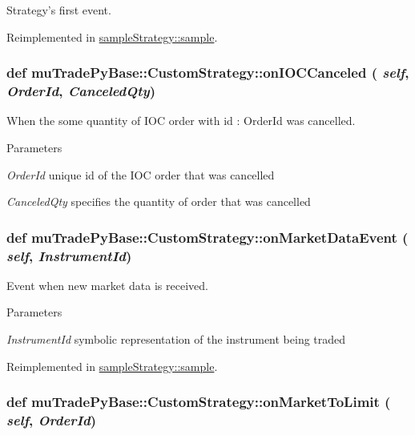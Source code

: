 Strategy's first event. 

Reimplemented in \hyperlink{classsampleStrategy_1_1sample_a412c1e16766e2af518a879c781dfb70c}{sampleStrategy::sample}.\hypertarget{classmuTradePyBase_1_1CustomStrategy_a409e9147a6d8d52dc2d3ad04544e31f3}{
\subsubsection[{onIOCCanceled}]{\setlength{\rightskip}{0pt plus 5cm}def muTradePyBase::CustomStrategy::onIOCCanceled ( {\em self}, \/   {\em OrderId}, \/   {\em CanceledQty})}}
\label{classmuTradePyBase_1_1CustomStrategy_a409e9147a6d8d52dc2d3ad04544e31f3}


When the some quantity of IOC order with id : OrderId was cancelled. 
\begin{DoxyParams}{Parameters}
\item[{\em OrderId}]unique id of the IOC order that was cancelled \item[{\em CanceledQty}]specifies the quantity of order that was cancelled \end{DoxyParams}
\hypertarget{classmuTradePyBase_1_1CustomStrategy_aea61c58829beb5f5e4bfa3355da9a23b}{
\subsubsection[{onMarketDataEvent}]{\setlength{\rightskip}{0pt plus 5cm}def muTradePyBase::CustomStrategy::onMarketDataEvent ( {\em self}, \/   {\em InstrumentId})}}
\label{classmuTradePyBase_1_1CustomStrategy_aea61c58829beb5f5e4bfa3355da9a23b}


Event when new market data is received. 
\begin{DoxyParams}{Parameters}
\item[{\em InstrumentId}]symbolic representation of the instrument being traded \end{DoxyParams}


Reimplemented in \hyperlink{classsampleStrategy_1_1sample_a3295ea611070075a0b28065e0d60cd4c}{sampleStrategy::sample}.\hypertarget{classmuTradePyBase_1_1CustomStrategy_ab15e441859c93390410973beb565872a}{
\subsubsection[{onMarketToLimit}]{\setlength{\rightskip}{0pt plus 5cm}def muTradePyBase::CustomStrategy::onMarketToLimit ( {\em self}, \/   {\em OrderId})}}
\label{classmuTradePyBase_1_1CustomStrategy_ab15e441859c93390410973beb565872a}


